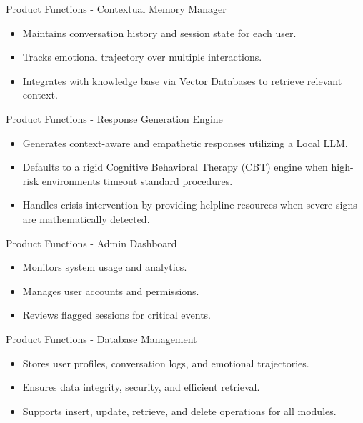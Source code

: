 \documentclass{beamer}
\begin{document}
\begin{frame}{Product Functions - Contextual Memory Manager}
\begin{itemize}
    \item Maintains conversation history and session state for each user.
    \item Tracks emotional trajectory over multiple interactions.
    \item Integrates with knowledge base via Vector Databases to retrieve relevant context.
\end{itemize}
\end{frame}

\begin{frame}{Product Functions - Response Generation Engine}
\begin{itemize}
    \item Generates context-aware and empathetic responses utilizing a Local LLM.
    \item Defaults to a rigid Cognitive Behavioral Therapy (CBT) engine when high-risk environments timeout standard procedures.
    \item Handles crisis intervention by providing helpline resources when severe signs are mathematically detected.
\end{itemize}
\end{frame}

\begin{frame}{Product Functions - Admin Dashboard}
\begin{itemize}
    \item Monitors system usage and analytics.
    \item Manages user accounts and permissions.
    \item Reviews flagged sessions for critical events.
\end{itemize}
\end{frame}

\begin{frame}{Product Functions - Database Management}
\begin{itemize}
    \item Stores user profiles, conversation logs, and emotional trajectories.
    \item Ensures data integrity, security, and efficient retrieval.
    \item Supports insert, update, retrieve, and delete operations for all modules.
\end{itemize}
\end{frame}
\end{document}
